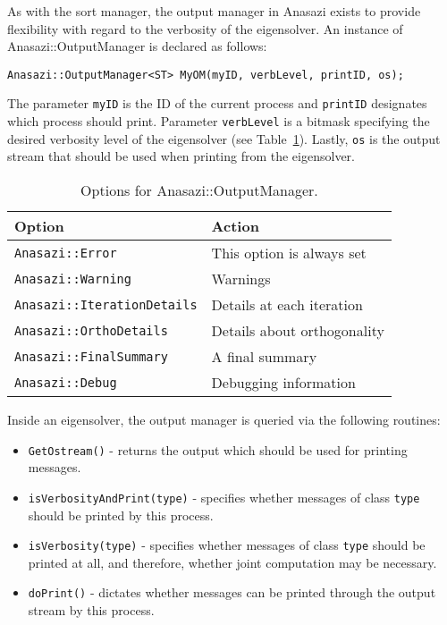 As with the sort manager, the output manager in Anasazi exists to provide
flexibility with regard to the verbosity of the eigensolver. An instance of
Anasazi::OutputManager is declared as follows:
\begin{verbatim}
Anasazi::OutputManager<ST> MyOM(myID, verbLevel, printID, os);
\end{verbatim}
The parameter \verb!myID! is the ID of the current process and \verb!printID! 
designates which process should print. Parameter \verb!verbLevel! is a bitmask
specifying the desired verbosity level of the eigensolver (see
Table~\ref{tab:anasazi:om}). Lastly, \verb!os! is the output stream that
should be used when printing from the eigensolver.

\begin{table}
\begin{center}
\begin{tabular}{| p{7cm} l |}
\hline
Option & Action \\
\hline
{\tt Anasazi::Error} & 
  This option is always set \\
{\tt Anasazi::Warning} & 
  Warnings \\
{\tt Anasazi::IterationDetails} & 
  Details at each iteration \\
{\tt Anasazi::OrthoDetails} & 
  Details about orthogonality \\
{\tt Anasazi::FinalSummary} & 
  A final summary \\
{\tt Anasazi::Debug} & 
  Debugging information \\
\hline
\end{tabular}
\caption{Options for Anasazi::OutputManager.}
\label{tab:anasazi:om}
\end{center}
\end{table}

Inside an eigensolver, the output manager is queried via the following
routines:
\begin{itemize}
\item \verb!GetOstream()! - returns the output which should be used for printing messages.
\item \verb!isVerbosityAndPrint(type)! - specifies whether messages of class
\verb!type! should be printed by this process.
\item \verb!isVerbosity(type)! - specifies whether messages of class \verb!type!
should be printed at all, and therefore, whether joint computation may be
necessary.
\item \verb!doPrint()! - dictates whether messages can be printed through the output
stream by this process.
\end{itemize}


